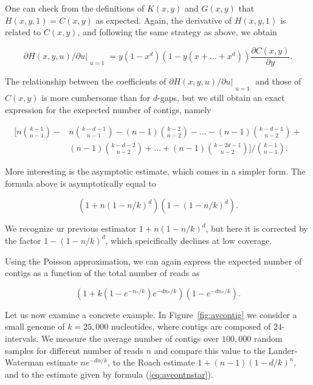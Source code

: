 \documentclass{article}
\begin{document}
One can check from the definitions of $K(x,y)$ and $G(x,y)$ that $H(x,y,1)
= C(x,y)$ as expected. Again, the derivative of $H(x,y,1)$ is related to
$C(x,y)$, and following the same strategy as above, we obtain

\begin{equation*}
\partial H(x,y,u)/\partial u|_{\substack{\\u=1}}
= y(1-x^d)\left( 1 - y(x+\ldots+x^d) \right)
\frac{\partial C(x,y)}{\partial y}.
\end{equation*}

The relationship between the coefficients of $\partial H(x,y,u) /\partial
u|_{\substack{\\u=1}}$ and those of $C(x,y)$ is more cumbersome than for
$d$-gaps, but we still obtain an exact expression for the exepected number
of contigs, namely

\begin{equation*}
\begin{split}
\Bigg[ n{k-1 \choose n-1} - &n{k-d-1 \choose n-1} -
(n-1){k-2 \choose n-2} - \ldots - (n-1) {k-d-1 \choose n-2} +
\\ &(n-1){k-d-2 \choose n-2} +
\ldots + (n-1){k-2d-1 \choose n-2} \Bigg] \Big/ {k-1 \choose n-1}.
\end{split}
\end{equation*}

More interesting is the asymptotic estimate, which comes in a
simpler form. The formula above is asymptotically equal to

\begin{equation}
\label{eq:avcont}
\left( 1+n(1-n/k)^d \right) \left(1-(1-n/k)^d\right).
\end{equation}

We recognize ur previous estimator
$1+n(1-n/k)^d$, but here it is corrected by the factor $1-(1-n/k)^d$,
which speicifically declines at low coverage.

Using the Poisson approximation, we can again express the expected number
of contigs as a function of the total number of reads as

\begin{equation}
\label{eq:avcontnstar}
(1 + k(1-e^{-n_*/k})e^{-dn_*/k} ) (1-e^{-dn_*/k}).
\end{equation}

Let us now examine a concrete example. In Figure~\ref{fig:avcontig} we
consider a small genome of $k = 25,000$ nucleotides, where contigs are
composed of $24$-intervals. We measure the average number of contigs over
$100,000$ random samples for different number of reads $n$ and compare
this value to the Lander-Waterman estimate $ne^{-dn/k}$, to the Roach
estimate $1+(n-1)(1-d/k)^n$, and to the estimate given by formula
(\ref{eq:avcontnstar}).
\end{document}
